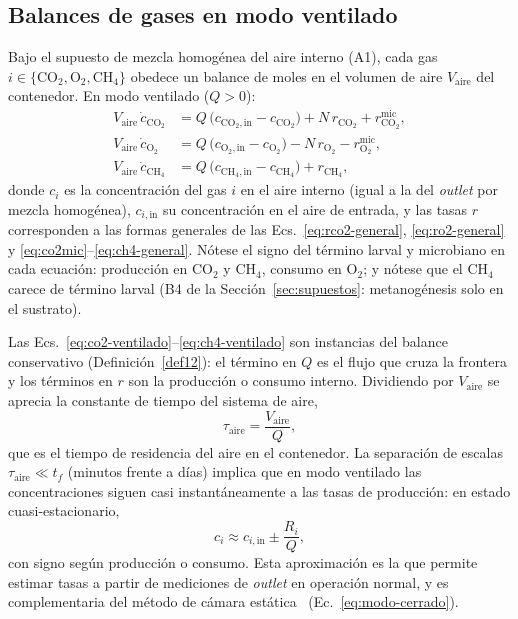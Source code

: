 \subsection{Balances de gases en modo ventilado}
\label{sec:gases-ventilado}

Bajo el supuesto de mezcla homogénea del aire interno (A1), cada gas
$i \in \{\mathrm{CO_2}, \mathrm{O_2}, \mathrm{CH_4}\}$ obedece un balance de
moles en el volumen de aire $V_{\mathrm{aire}}$ del contenedor. En modo
ventilado ($Q > 0$):
\begin{align}
V_{\mathrm{aire}}\,\dot{c}_{\mathrm{CO_2}} &=
Q\,\bigl(c_{\mathrm{CO_2,in}} - c_{\mathrm{CO_2}}\bigr)
+ N\,r_{\mathrm{CO_2}} + r_{\mathrm{CO_2}}^{\mathrm{mic}},
\label{eq:co2-ventilado}\\
V_{\mathrm{aire}}\,\dot{c}_{\mathrm{O_2}} &=
Q\,\bigl(c_{\mathrm{O_2,in}} - c_{\mathrm{O_2}}\bigr)
- N\,r_{\mathrm{O_2}} - r_{\mathrm{O_2}}^{\mathrm{mic}},
\label{eq:o2-ventilado}\\
V_{\mathrm{aire}}\,\dot{c}_{\mathrm{CH_4}} &=
Q\,\bigl(c_{\mathrm{CH_4,in}} - c_{\mathrm{CH_4}}\bigr)
+ r_{\mathrm{CH_4}},
\label{eq:ch4-ventilado}
\end{align}
donde $c_i$ es la concentración del gas $i$ en el aire interno (igual a la
del \emph{outlet} por mezcla homogénea), $c_{i,\mathrm{in}}$ su
concentración en el aire de entrada, y las tasas $r$ corresponden a las
formas generales de las Ecs.~\eqref{eq:rco2-general},
\eqref{eq:ro2-general} y \eqref{eq:co2mic}--\eqref{eq:ch4-general}.
Nótese el signo del término larval y microbiano en cada ecuación:
producción en CO$_2$ y CH$_4$, consumo en O$_2$; y nótese que el CH$_4$
carece de término larval (B4 de la Sección~\ref{sec:supuestos}: metanogénesis solo en el
sustrato).

\begin{remark}\label{rem:estructura-gas}
Las Ecs.~\eqref{eq:co2-ventilado}--\eqref{eq:ch4-ventilado} son instancias
del balance conservativo (Definición~\ref{def12}): el término en $Q$ es el
flujo que cruza la frontera y los términos en $r$ son la producción o
consumo interno. Dividiendo por $V_{\mathrm{aire}}$ se aprecia la constante
de tiempo del sistema de aire,
\begin{equation}
\tau_{\mathrm{aire}} = \frac{V_{\mathrm{aire}}}{Q},
\label{eq:tau-aire}
\end{equation}
que es el tiempo de residencia del aire en el contenedor. La separación de
escalas $\tau_{\mathrm{aire}} \ll t_f$ (minutos frente a días) implica que
en modo ventilado las concentraciones siguen casi instantáneamente a las
tasas de producción: en estado cuasi-estacionario,
\begin{equation}
c_i \approx c_{i,\mathrm{in}} \pm \frac{R_i}{Q},
\label{eq:cuasi-estacionario}
\end{equation}
con signo según producción o consumo. Esta aproximación es la que permite
estimar tasas a partir de mediciones de \emph{outlet} en operación normal,
y es complementaria del método de cámara estática~\citep{hutchinsonImprovedSoilCover1981,ermolaevGreenhouseGasEmissions2019}
(Ec.~\eqref{eq:modo-cerrado}).
\end{remark}

